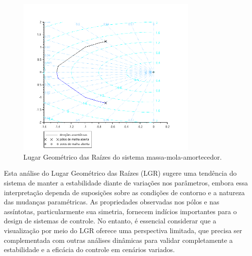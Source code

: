\begin{figure}[h]
    \centering
    \includegraphics[width=0.8\textwidth]{atividades/7-atividade/assets/lgr.png}
    \caption{Lugar Geométrico das Raízes do sistema massa-mola-amortecedor.}
    \label{fig:LGR}
\end{figure}

Esta análise do Lugar Geométrico das Raízes (LGR) sugere uma tendência do sistema de manter a estabilidade diante de variações nos parâmetros, embora essa interpretação dependa de suposições sobre as condições de contorno e a natureza das mudanças paramétricas. As propriedades observadas nos pólos e nas assíntotas, particularmente sua simetria, fornecem indícios importantes para o design de sistemas de controle. No entanto, é essencial considerar que a visualização por meio do LGR oferece uma perspectiva limitada, que precisa ser complementada com outras análises dinâmicas para validar completamente a estabilidade e a eficácia do controle em cenários variados.

